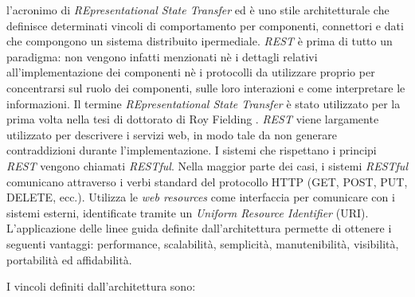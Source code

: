 \upe l'acronimo di \emph{REpresentational State Transfer} ed è uno stile architetturale che definisce determinati vincoli di comportamento per componenti, connettori e dati che compongono un sistema distribuito ipermediale. \emph{REST} è prima di tutto un paradigma: non vengono infatti menzionati nè i dettagli relativi all'implementazione dei componenti nè i protocolli da utilizzare proprio per concentrarsi sul ruolo dei componenti, sulle loro interazioni e come interpretare le informazioni. Il termine \emph{REpresentational State Transfer} è stato utilizzato per la prima volta nella tesi di dottorato di Roy Fielding \cite{fielding2000architectural}. \emph{REST} viene largamente utilizzato per descrivere i servizi web, in modo tale da non generare contraddizioni durante l'implementazione. I sistemi che rispettano i principi \emph{REST} vengono chiamati \emph{RESTful}. Nella maggior parte dei casi, i sistemi \emph{RESTful} comunicano attraverso i verbi standard del protocollo HTTP (GET, POST, PUT, DELETE, ecc.). Utilizza le \emph{web resources} come interfaccia per comunicare con i sistemi esterni, identificate tramite un \emph{Uniform Resource Identifier} (URI). L'applicazione delle linee guida definite dall'architettura permette di ottenere i seguenti vantaggi: performance, scalabilità, semplicità, manutenibilità, visibilità, portabilità ed affidabilità.

I vincoli definiti dall'architettura sono:

